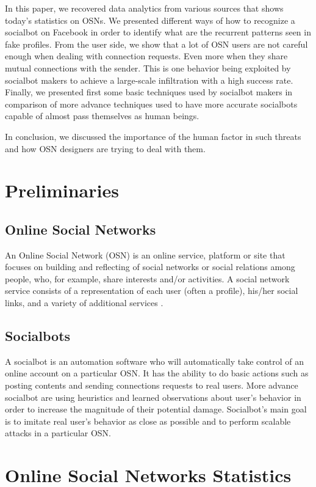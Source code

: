 \documentclass[12pt,a4paper]{article}
\begin{document}
In this paper, we recovered data analytics from various sources that shows today’s
statistics on OSNs. We presented different ways of how to recognize a socialbot on Facebook
in order to identify what are the recurrent patterns seen in fake profiles. From the user
side, we show that a lot of OSN users are not careful enough when dealing with connection
requests. Even more when they share mutual connections with the sender. This is one behavior
being exploited by socialbot makers to achieve a large-scale infiltration with a high success
rate. Finally, we presented first some basic techniques used by socialbot makers in
comparison of more advance techniques used to have more accurate socialbots capable of almost
pass themselves as human beings.

In conclusion, we discussed the importance of the human factor in such threats and how OSN
designers are trying to deal with them.

\section{Preliminaries}

  \subsection{Online Social Networks}
  An Online Social Network (OSN) is an online service, platform or site that focuses on building
  and reflecting of social networks or social relations among people, who, for example, share
  interests and/or activities. A social network service consists of a representation of each
  user (often a profile), his/her social links, and a variety of additional services
  \cite{wikipedia_social_networking_service}.

  \subsection{Socialbots}
  A socialbot is an automation software who will automatically take control of an online account
  on a particular OSN. It has the ability to do basic actions such as posting contents and
  sending connections requests to real users. More advance socialbot are using heuristics and
  learned observations about user’s behavior in order to increase the magnitude of their potential
  damage. Socialbot’s main goal is to imitate real user’s behavior as close as possible and to
  perform scalable attacks in a particular OSN.

\section{Online Social Networks Statistics}
\end{document}
